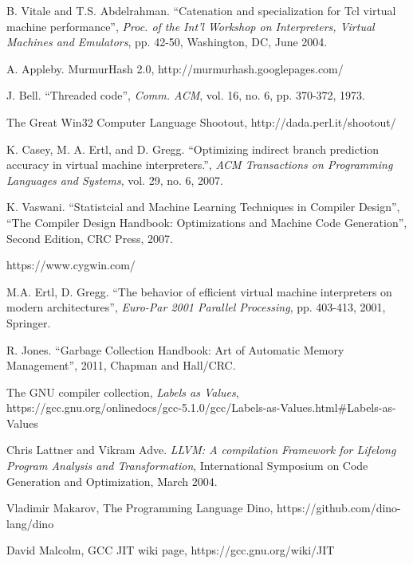 \documentclass[preprint]{sigplanconf}
\begin{document}
\begin{thebibliography}{}
\softraggedright

B. Vitale and T.S. Abdelrahman. ``Catenation and specialization for
Tcl virtual machine performance'', \emph{Proc. of the Int'l Workshop on
Interpreters, Virtual Machines and Emulators}, pp. 42-50, Washington,
DC, June 2004.

A. Appleby. MurmurHash 2.0,
http://murmurhash.googlepages.com/

  J. Bell. ``Threaded code'', \emph{Comm. ACM}, vol. 16, no. 6,
  pp. 370-372, 1973.

  The Great Win32 Computer Language Shootout,
  http://dada.perl.it/shootout/
  
  K. Casey, M. A. Ertl, and D. Gregg. ``Optimizing indirect
  branch prediction accuracy in virtual machine interpreters.'',
  \emph{ACM Transactions on Programming Languages and Systems},
  vol. 29, no. 6, 2007.

  K. Vaswani. ``Statistcial and Machine Learning Techniques in Compiler Design'',
  ``The Compiler Design Handbook: Optimizations and Machine Code Generation'',
   Second Edition, CRC Press, 2007.
  
https://www.cygwin.com/

M.A. Ertl, D. Gregg. ``The behavior of efficient virtual machine
interpreters on modern architectures'', \emph{Euro-Par 2001 Parallel
  Processing},  pp. 403-413, 2001, Springer.

R. Jones. ``Garbage Collection Handbook: Art of Automatic Memory Management'',
2011, Chapman and Hall/CRC.

 The GNU compiler collection, \emph{Labels as Values},
https://gcc.gnu.org/onlinedocs/gcc-5.1.0/gcc/Labels-as-Values.html\#Labels-as-Values
  
Chris Lattner and Vikram Adve.  \emph{LLVM: A compilation
  Framework for Lifelong Program Analysis and Transformation},
International Symposium on Code Generation and Optimization, March
2004.

 Vladimir Makarov, The Programming Language Dino,
https://github.com/dino-lang/dino
  
 David Malcolm, GCC JIT wiki page,
https://gcc.gnu.org/wiki/JIT
  

\end{thebibliography}
\end{document}
